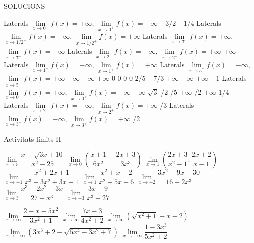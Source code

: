 \documentclass[11pt, a4paper]{book}
\begin{document}
SOLUCIONS

\begin{enumerate}
  \task Laterals $\mathop{lim}\limits_{x\to 0^- } f(x)=+\infty$, $\mathop{lim}\limits_{x\to 0^+ } f(x)=-\infty$
  \task $-3/2$
  \task $-1/4$
  \task Laterals $\mathop{lim}\limits_{x\to 1/2^- } f(x)=-\infty$, $\mathop{lim}\limits_{x\to 1/2^+ } f(x)=+\infty$
  \task Laterals $\mathop{lim}\limits_{x\to 7^- } f(x)=+\infty$, $\mathop{lim}\limits_{x\to 7^+ } f(x)=-\infty$
  \task Laterals $\mathop{lim}\limits_{x\to 2^- } f(x)=-\infty$, $\mathop{lim}\limits_{x\to 2^+ } f(x)=+\infty$
  \task $+\infty$
  \task Laterals $\mathop{lim}\limits_{x\to 1^- } f(x)=-\infty$, $\mathop{lim}\limits_{x\to 1^+ } f(x)=+\infty$
  \task Laterals $\mathop{lim}\limits_{x\to 5^- } f(x)=-\infty$, $\mathop{lim}\limits_{x\to 5^+ } f(x)=+\infty$
  \task $+\infty$
  \task $-\infty$
  \task $+\infty$
  \task $0$
  \task $0$
  \task $0$
  \task $0$
  \task $2/5$
  \task $-7/3$
  \task $+\infty$
  \task $-\infty$
  \task $+\infty$
  \task $-1$
  \task Laterals $\mathop{lim}\limits_{x\to 0^- } f(x)=+\infty$, $\mathop{lim}\limits_{x\to 0^+ } f(x)=-\infty$
  \task $-\infty$
  \task $\sqrt{3}$
  /2
  /5
  \task $+\infty$
  /2
  \task $+\infty$
  \task $1/4$
  \task Laterals $\mathop{lim}\limits_{x\to 2^- } f(x)=-\infty$, $\mathop{lim}\limits_{x\to 2^+ } f(x)=+\infty$
  /3
  \task Laterals $\mathop{lim}\limits_{x\to 3^- } f(x)=-\infty$, $\mathop{lim}\limits_{x\to 3^+ } f(x)=+\infty$
  /2
\end{enumerate}


Activitats límits II

\begin{enumerate}
  \task $\mathop{lim}\limits_{x\to 5 } \dfrac{x-\sqrt{3x+10}}{x^2-25}$
  \task $\mathop{lim}\limits_{x\to 0 } \left( \dfrac{x+1}{6x^2} -   \dfrac{2x+3}{3x^3} \right)$
  \task $\mathop{lim}\limits_{x\to 1 } \left( \dfrac{2x+3}{x^2-1} : \dfrac{2x+2}{x-1} \right)$
  \task $\mathop{lim}\limits_{x\to -1 } \dfrac{x^2+2x+1}{x^3+3x^2+3x+1}$
  \task $\mathop{lim}\limits_{x\to 1 } \dfrac{x^2+x-2}{x^2+5x+6}$
  \task $\mathop{lim}\limits_{x\to -2 } \dfrac{3x^2-9x-30}{16+2x^3}$
  \task $\mathop{lim}\limits_{x\to 3 } \dfrac{x^3-2x^2-3x}{27-x^3}$
  \task $\mathop{lim}\limits_{x\to -3 } \dfrac{3x+9}{x^3-27}$

  \task $\mathop{lim}\limits_{x\to \infty } \dfrac{2-x-5x^2}{3x^2+1}$
  \task $\mathop{lim}\limits_{x\to \infty } \dfrac{7x-3}{4x^2+2}$
  \task $\mathop{lim}\limits_{x\to \infty } \left( \sqrt{x^2+1}-x-2 \right)$
  \task $\mathop{lim}\limits_{x\to -\infty } \left( 3x^3 + 2 - \sqrt{5x^4-3x^2+7} \right)$
  \task $\mathop{lim}\limits_{x\to -\infty } \dfrac{1-3x^3}{5x^2+2}$
\end{enumerate}
\end{document}
